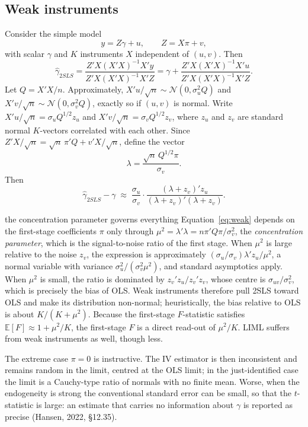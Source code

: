 \documentclass[11pt,a4paper]{article}
\newcommand{\E}{\mathbb{E}}
\newcommand{\N}{\mathcal{N}}
\begin{document}
\subsection{Weak instruments}\label{sec:weak}

Consider the simple model
\[
y=Z\gamma+u,\qquad Z=X\pi+v,
\]
with scalar $\gamma$ and $K$ instruments $X$ independent of $(u,v)$. Then
\[
\hat\gamma_{2SLS}=\frac{Z'X(X'X)^{-1}X'y}{Z'X(X'X)^{-1}X'Z}=\gamma+\frac{Z'X(X'X)^{-1}X'u}{Z'X(X'X)^{-1}X'Z}.
\]
Let $Q=X'X/n$. Approximately, $X'u/\sqrt n\sim\N(0,\sigma_u^2Q)$ and $X'v/\sqrt n\sim\N(0,\sigma_v^2Q)$, exactly so if $(u,v)$ is normal. Write $X'u/\sqrt n=\sigma_uQ^{1/2}z_u$ and $X'v/\sqrt n=\sigma_vQ^{1/2}z_v$, where $z_u$ and $z_v$ are standard normal $K$-vectors correlated with each other. Since $Z'X/\sqrt n=\sqrt n\,\pi'Q+v'X/\sqrt n$, define the vector
\[
\lambda=\frac{\sqrt n\,Q^{1/2}\pi}{\sigma_v}.
\]
Then
\begin{equation}\label{eq:weak}
\hat\gamma_{2SLS}-\gamma\;\approx\;\frac{\sigma_u}{\sigma_v}\cdot\frac{(\lambda+z_v)'z_u}{(\lambda+z_v)'(\lambda+z_v)} .
\end{equation}

\begin{whybox}{the concentration parameter governs everything}
Equation~\eqref{eq:weak} depends on the first-stage coefficients $\pi$ only through $\mu^2=\lambda'\lambda=n\pi'Q\pi/\sigma_v^2$, the \emph{concentration parameter}, which is the signal-to-noise ratio of the first stage. When $\mu^2$ is large relative to the noise $z_v$, the expression is approximately $(\sigma_u/\sigma_v)\lambda'z_u/\mu^2$, a normal variable with variance $\sigma_u^2/(\sigma_v^2\mu^2)$, and standard asymptotics apply. When $\mu^2$ is small, the ratio is dominated by $z_v'z_u/z_v'z_v$, whose centre is $\sigma_{uv}/\sigma_v^2$, which is precisely the bias of OLS. Weak instruments therefore pull 2SLS toward OLS and make its distribution non-normal; heuristically, the bias relative to OLS is about $K/(K+\mu^2)$. Because the first-stage $F$-statistic satisfies $\E[F]\approx1+\mu^2/K$, the first-stage $F$ is a direct read-out of $\mu^2/K$. LIML suffers from weak instruments as well, though less.

The extreme case $\pi=0$ is instructive. The IV estimator is then inconsistent and remains random in the limit, centred at the OLS limit; in the just-identified case the limit is a Cauchy-type ratio of normals with no finite mean. Worse, when the endogeneity is strong the conventional standard error can be small, so that the $t$-statistic is large: an estimate that carries no information about $\gamma$ is reported as precise (Hansen, 2022, \S12.35).
\end{whybox}
\end{document}
